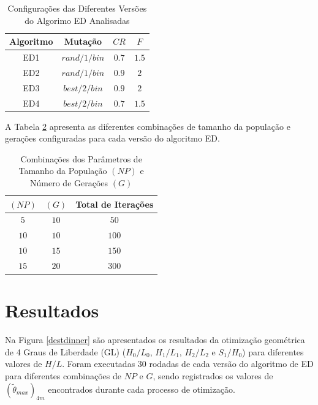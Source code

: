\documentclass[12pt,A4,A4pt]{article}
\begin{document}
\begin{table}[htbp]
\small
\centering
\caption{\small Configurações das Diferentes Versões do Algorimo ED Analisadas}
\begin{tabular}{cccc}
\hline
Algoritmo & Mutação & $CR$ & $F$ \\
\hline
ED1 & $rand/1/bin$ & $0.7$ & $1.5$  \\
ED2 & $rand/1/bin$ & $0.9$ & $2$  \\
ED3 & $best/2/bin$ & $0.9$ & $2$  \\
ED4 & $best/2/bin$ & $0.7$ & $1.5$  \\
\hline
\end{tabular}
  \label{tab:algos}
\end{table}

A Tabela \ref{tab:popgeracao} apresenta as diferentes combinações de tamanho da população e gerações configuradas para cada versão do algoritmo ED.

\begin{table}[htbp]
\small
\centering
\caption{\small Combinações dos Parâmetros de Tamanho da População $(NP)$ e Número de Gerações $(G)$}
\begin{tabular}{ccc}
\hline
$(NP)$ & $(G)$ & Total de Iterações \\
\hline
$5$ & $10$ & $50$	\\
$10$ & $10$ & $100$	\\
$10$ & $15$ & $150$	\\
$15$ & $20$ & $300$	\\
\hline
\end{tabular}
  \label{tab:popgeracao}
\end{table}

\section{Resultados}
\label{opt}
\hspace{0.5cm}Na Figura \ref{destdinner} são apresentados os resultados da otimização geométrica de 4 Graus de Liberdade (GL) ($H_{0}/L_{0}$, $H_{1}/L_{1}$, $H_{2}/L_{2}$ e $S_{1}/H_{0}$) para diferentes valores de $H/L$. Foram executadas 30 rodadas de cada versão do algoritmo de ED para diferentes combinações de $NP$ e $G$, sendo registrados os valores de $({\tilde{\theta}}_{max})_{4m}$ encontrados durante cada processo de otimização. 
\end{document}
